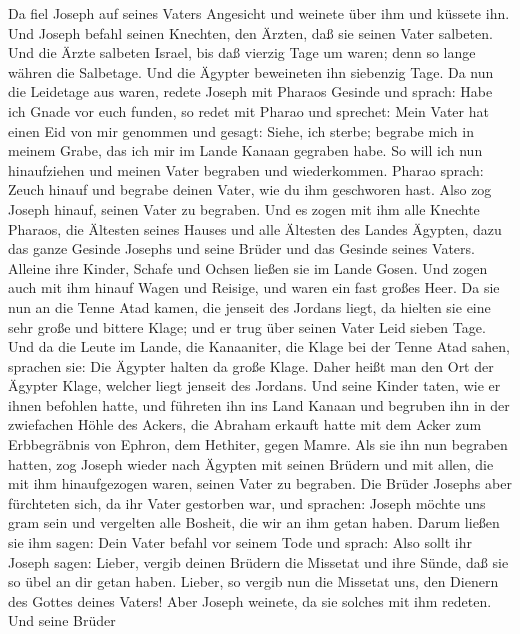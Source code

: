  Da fiel Joseph auf seines Vaters Angesicht und weinete über
ihm und küssete ihn.  Und Joseph befahl seinen Knechten, den
Ärzten, daß sie seinen Vater salbeten. Und die Ärzte salbeten Israel,
 bis daß vierzig Tage um waren; denn so lange währen die
Salbetage. Und die Ägypter beweineten ihn siebenzig Tage. 
Da nun die Leidetage aus waren, redete Joseph mit Pharaos Gesinde und
sprach: Habe ich Gnade vor euch funden, so redet mit Pharao und
sprechet:  Mein Vater hat einen Eid von mir genommen und
gesagt: Siehe, ich sterbe; begrabe mich in meinem Grabe, das ich mir im
Lande Kanaan gegraben habe. So will ich nun hinaufziehen und meinen
Vater begraben und wiederkommen.  Pharao sprach: Zeuch
hinauf und begrabe deinen Vater, wie du ihm geschworen hast.
 Also zog Joseph hinauf, seinen Vater zu begraben. Und es
zogen mit ihm alle Knechte Pharaos, die Ältesten seines Hauses und alle
Ältesten des Landes Ägypten,  dazu das ganze Gesinde Josephs
und seine Brüder und das Gesinde seines Vaters. Alleine ihre Kinder,
Schafe und Ochsen ließen sie im Lande Gosen.  Und zogen auch
mit ihm hinauf Wagen und Reisige, und waren ein fast großes Heer.
 Da sie nun an die Tenne Atad kamen, die jenseit des
Jordans liegt, da hielten sie eine sehr große und bittere Klage; und er
trug über seinen Vater Leid sieben Tage.  Und da die Leute
im Lande, die Kanaaniter, die Klage bei der Tenne Atad sahen, sprachen
sie: Die Ägypter halten da große Klage. Daher heißt man den Ort der
Ägypter Klage, welcher liegt jenseit des Jordans.  Und
seine Kinder taten, wie er ihnen befohlen hatte,  und
führeten ihn ins Land Kanaan und begruben ihn in der zwiefachen Höhle
des Ackers, die Abraham erkauft hatte mit dem Acker zum Erbbegräbnis von
Ephron, dem Hethiter, gegen Mamre.  Als sie ihn nun
begraben hatten, zog Joseph wieder nach Ägypten mit seinen Brüdern und
mit allen, die mit ihm hinaufgezogen waren, seinen Vater zu begraben.
 Die Brüder Josephs aber fürchteten sich, da ihr Vater
gestorben war, und sprachen: Joseph möchte uns gram sein und vergelten
alle Bosheit, die wir an ihm getan haben.  Darum ließen sie
ihm sagen: Dein Vater befahl vor seinem Tode und sprach: 
Also sollt ihr Joseph sagen: Lieber, vergib deinen Brüdern die Missetat
und ihre Sünde, daß sie so übel an dir getan haben. Lieber, so vergib
nun die Missetat uns, den Dienern des Gottes deines Vaters! Aber Joseph
weinete, da sie solches mit ihm redeten.  Und seine Brüder
